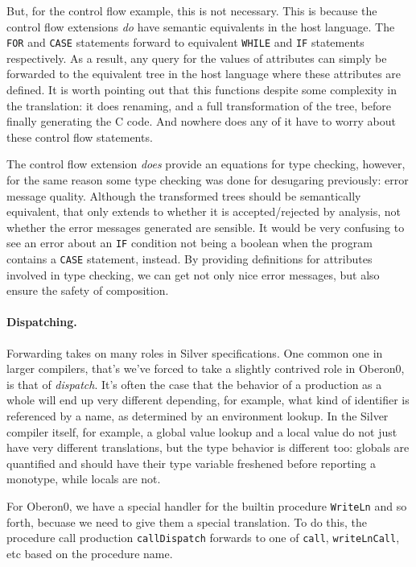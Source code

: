 But, for the control flow example, this is not necessary.
%
This is because the control flow extensions \textit{do} have semantic
equivalents in the host language.
%
The \texttt{FOR} and \texttt{CASE} statements forward to equivalent
\texttt{WHILE} and \texttt{IF} statements respectively.
%
As a result, any query for the values of attributes can simply be forwarded to
the equivalent tree in the host language where these attributes are defined.
%
It is worth pointing out that this functions despite some complexity in the
translation: it does renaming, and a full transformation of the tree, before
finally generating the C code.
%
And nowhere does any of it have to worry about these control flow statements.

The control flow extension \textit{does} provide an equations for type checking,
however, for the same reason some type checking was done for desugaring previously:
error message quality.
%
Although the transformed trees should be semantically equivalent, that only
extends to whether it is accepted/rejected by analysis, not whether the error
messages generated are sensible.
%
It would be very confusing to see an error about an \texttt{IF} condition
not being a boolean when the program contains a \texttt{CASE} statement, instead.
%
By providing definitions for attributes involved in type checking, we can
get not only nice error messages, but also ensure the safety of composition.

\paragraph{Dispatching.} %
Forwarding takes on many roles in Silver specifications.
%
One common one in larger compilers, that's we've forced to take a slightly
contrived role in Oberon0, is that of \textit{dispatch}.
%
It's often the case that the behavior of a production as a whole will end up
very different depending, for example, what kind of identifier is referenced
by a name, as determined by an environment lookup.
%
In the Silver compiler itself, for example, a global value lookup and a local
value do not just have very different translations, but the type behavior is
different too: globals are quantified and should have their type variable freshened
before reporting a monotype, while locals are not.

For Oberon0, we have a special handler for the builtin procedure \texttt{WriteLn}
and so forth, becuase we need to give them a special translation.
%
To do this, the procedure call production \texttt{callDispatch} forwards to one
of \texttt{call}, \texttt{writeLnCall}, etc based on the procedure name.


